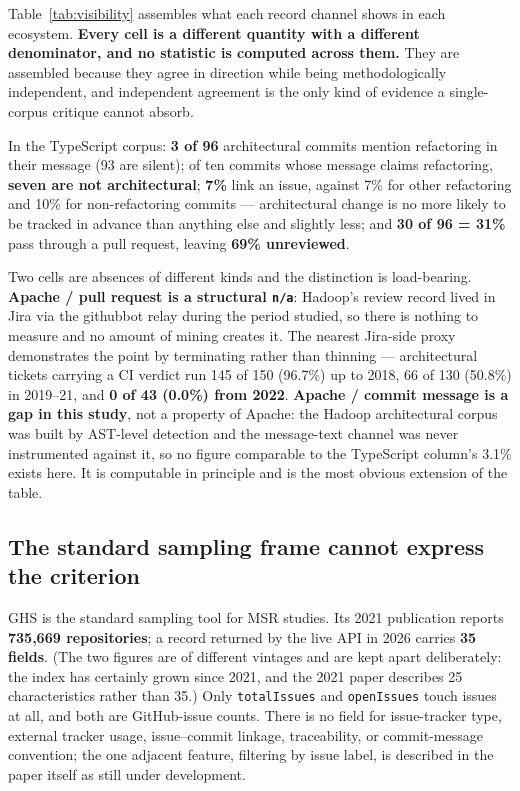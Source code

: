 \documentclass[11pt,a4paper]{article}
\begin{document}
Table~\ref{tab:visibility} assembles what each record channel shows in each ecosystem. \textbf{Every cell is a different quantity with a different denominator, and no statistic is computed across them.} They are assembled because they agree in direction while being methodologically independent, and independent agreement is the only kind of evidence a single-corpus critique cannot absorb.

In the TypeScript corpus: \textbf{3 of 96} architectural commits mention refactoring in their message (93 are silent); of ten commits whose message claims refactoring, \textbf{seven are not architectural}; \textbf{7\%} link an issue, against 7\% for other refactoring and 10\% for non-refactoring commits --- architectural change is no more likely to be tracked in advance than anything else and slightly less; and \textbf{30 of 96 = 31\%} pass through a pull request, leaving \textbf{69\% unreviewed}.

Two cells are absences of different kinds and the distinction is load-bearing. \textbf{Apache / pull request is a structural \texttt{n/\allowbreak{}a}}: Hadoop's review record lived in Jira via the githubbot relay during the period studied, so there is nothing to measure and no amount of mining creates it. The nearest Jira-side proxy demonstrates the point by terminating rather than thinning --- architectural tickets carrying a CI verdict run 145 of 150 (96.7\%) up to 2018, 66 of 130 (50.8\%) in 2019--21, and \textbf{0 of 43 (0.0\%) from 2022}. \textbf{Apache / commit message is a gap in this study}, not a property of Apache: the Hadoop architectural corpus was built by AST-level detection and the message-text channel was never instrumented against it, so no figure comparable to the TypeScript column's 3.1\% exists here. It is computable in principle and is the most obvious extension of the table.

\subsection{The standard sampling frame cannot express the criterion}
\label{sec:4.6}

GHS is the standard sampling tool for MSR studies. Its 2021 publication reports \textbf{735,669 repositories}; a record returned by the live API in 2026 carries \textbf{35 fields}. (The two figures are of different vintages and are kept apart deliberately: the index has certainly grown since 2021, and the 2021 paper describes 25 characteristics rather than 35.) Only \texttt{totalIssues} and \texttt{openIssues} touch issues at all, and both are GitHub-issue counts. There is no field for issue-tracker type, external tracker usage, issue--commit linkage, traceability, or commit-message convention; the one adjacent feature, filtering by issue label, is described in the paper itself as still under development.
\end{document}
